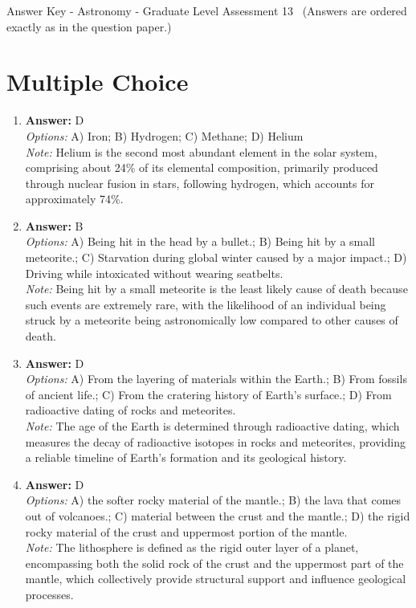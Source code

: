 \documentclass[12pt]{article}
\begin{document}
\begin{center}
Answer Key - Astronomy - Graduate Level Assessment 13 \
\small (Answers are ordered exactly as in the question paper.)
\end{center}

\section*{Multiple Choice}
\begin{enumerate}[label=\arabic*.]
\item \textbf{Answer:} D
\\ \textit{Options:} A) Iron; B) Hydrogen; C) Methane; D) Helium
\\ \textit{Note:} Helium is the second most abundant element in the solar system, comprising about 24\% of its elemental composition, primarily produced through nuclear fusion in stars, following hydrogen, which accounts for approximately 74\%.
\item \textbf{Answer:} B
\\ \textit{Options:} A) Being hit in the head by a bullet.; B) Being hit by a small meteorite.; C) Starvation during global winter caused by a major impact.; D) Driving while intoxicated without wearing seatbelts.
\\ \textit{Note:} Being hit by a small meteorite is the least likely cause of death because such events are extremely rare, with the likelihood of an individual being struck by a meteorite being astronomically low compared to other causes of death.
\item \textbf{Answer:} D
\\ \textit{Options:} A) From the layering of materials within the Earth.; B) From fossils of ancient life.; C) From the cratering history of Earth's surface.; D) From radioactive dating of rocks and meteorites.
\\ \textit{Note:} The age of the Earth is determined through radioactive dating, which measures the decay of radioactive isotopes in rocks and meteorites, providing a reliable timeline of Earth's formation and its geological history.
\item \textbf{Answer:} D
\\ \textit{Options:} A) the softer rocky material of the mantle.; B) the lava that comes out of volcanoes.; C) material between the crust and the mantle.; D) the rigid rocky material of the crust and uppermost portion of the mantle.
\\ \textit{Note:} The lithosphere is defined as the rigid outer layer of a planet, encompassing both the solid rock of the crust and the uppermost part of the mantle, which collectively provide structural support and influence geological processes.

\end{enumerate}
\end{document}
